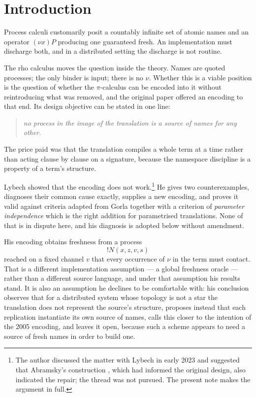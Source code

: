 \documentclass[11pt]{article}
\theoremstyle{definition}
\theoremstyle{plain}
\theoremstyle{remark}
\begin{document}
\section{Introduction}\label{sec:intro}

Process calculi customarily posit a countably infinite set of atomic
names and an operator $(\nu x)P$ producing one guaranteed fresh. An
implementation must discharge both, and in a distributed setting the
discharge is not routine.

The rho calculus \cite{MeredithRadestock05} moves the question inside the
theory. Names are quoted processes; the only binder is input; there is no
$\nu$. Whether this is a viable position is the question of whether the
$\pi$-calculus can be encoded into it without reintroducing what was
removed, and the original paper offered an encoding to that end. Its
design objective can be stated in one line:

\begin{quote}
\emph{no process in the image of the translation is a source of names for
any other.}
\end{quote}

\noindent
The price paid was that the translation compiles a whole term at a time
rather than acting clause by clause on a signature, because the namespace
discipline is a property of a term's structure.

Lybech \cite{Lybech22} showed that the encoding does not work.\footnote{%
The author discussed the matter with Lybech in early 2023 and suggested
that Abramsky's construction \cite{Abramsky93}, which had informed the
original design, also indicated the repair; the thread was not pursued.
The present note makes the argument in full.}
He gives two counterexamples, diagnoses their common cause exactly,
supplies a new encoding, and proves it valid against criteria adapted
from Gorla \cite{Gorla10} together with a criterion of \emph{parameter
independence} which is the right addition for parametrised translations.
None of that is in dispute here, and his diagnosis is adopted below
without amendment.

His encoding obtains freshness from a process
\[
  !N(x,z,v,s)
\]
reached on a fixed channel $v$ that every occurrence of $\nu$ in the term
must contact. That is a different implementation assumption --- a global
freshness oracle --- rather than a different source language, and under
that assumption his results stand. It is also an assumption he declines to
be comfortable with: his conclusion observes that for a distributed
system whose topology is not a star the translation does not represent
the source's structure, proposes instead that each replication instantiate
its own source of names, calls this closer to the intention of the 2005
encoding, and leaves it open, because such a scheme appears to need a
source of fresh names in order to build one.
\end{document}
